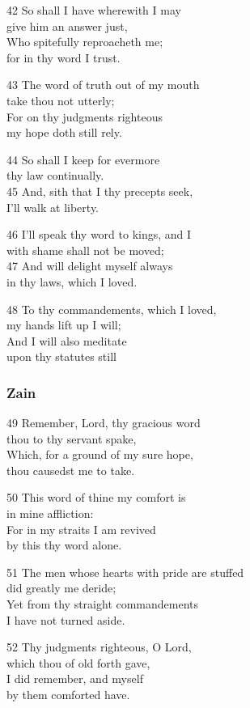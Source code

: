 42 So shall I have wherewith I may\\
give him an answer just,\\
Who spitefully reproacheth me;\\
for in thy word I trust.

43 The word of truth out of my mouth\\
take thou not utterly;\\
For on thy judgments righteous\\
my hope doth still rely.

44 So shall I keep for evermore\\
thy law continually.\\
45 And, sith that I thy precepts seek,\\
I’ll walk at liberty.

46 I’ll speak thy word to kings, and I\\
with shame shall not be moved;\\
47 And will delight myself always\\
in thy laws, which I loved.

48 To thy commandements, which I loved,\\
my hands lift up I will;\\
And I will also meditate\\
upon thy statutes still

\subsubsection*{Zain}

49 Remember, Lord, thy gracious word\\
thou to thy servant spake,\\
Which, for a ground of my sure hope,\\
thou causedst me to take.

50 This word of thine my comfort is\\
in mine affliction:\\
For in my straits I am revived\\
by this thy word alone.

51 The men whose hearts with pride are stuffed\\
did greatly me deride;\\
Yet from thy straight commandements\\
I have not turned aside.

52 Thy judgments righteous, O Lord,\\
which thou of old forth gave,\\
I did remember, and myself\\
by them comforted have.

